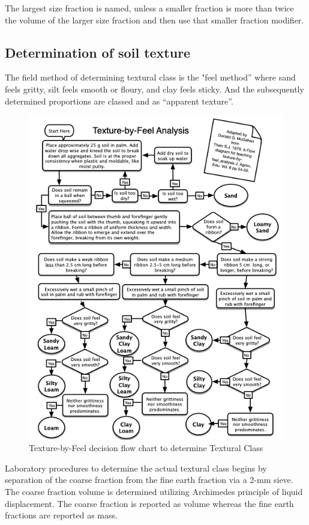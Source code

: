\documentclass[a5paper]{report}
\begin{document}
The largest size fraction is named, unless a smaller fraction is more than twice the volume of the larger size fraction and then use that smaller fraction modifier.
    
\subsection{Determination of soil texture}

The field method of determining textural class is the "feel method” where sand feels gritty, silt feels smooth or floury, and clay feels sticky. And the subsequently determined proportions are classed and as “apparent texture”.

\begin{figure}
    \includegraphics[width=0.9\columnwidth]{images/TextureFlowChart.png}
    \caption{Texture-by-Feel decision flow chart to determine Textural Class}
    \label{fig:TextureByFeelFlowChart}
\end{figure}

Laboratory procedures to determine the actual textural class begins by separation of the coarse fraction from the fine earth fraction via a 2-mm sieve. The coarse fraction volume is determined utilizing Archimedes principle of liquid displacement. The coarse fraction is reported as volume whereas the fine earth fractions are reported as mass.
\end{document}
